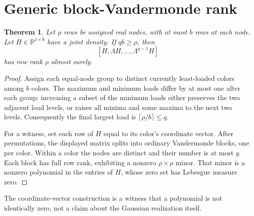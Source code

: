 \documentclass[11pt]{article}
\newtheorem{theorem}{Theorem}[section]
\newcommand{\R}{\mathbb R}
\begin{document}
\section{Generic block-Vandermonde rank}
\begin{theorem}\label{ranklemma}
Let $\rho$ rows be assigned real nodes, with at most $b$ rows at each node.
Let $H\in\R^{\rho\times b}$ have a joint density. If $qb\ge\rho$, then
\[
 [H,\Lambda H,\ldots,\Lambda^{q-1}H]
\]
has row rank $\rho$ almost surely.
\end{theorem}
\begin{proof}
Assign each equal-node group to distinct currently least-loaded colors among
$b$ colors. The maximum and minimum loads differ by at most one after each
group: increasing a subset of the minimum loads either preserves the two
adjacent load levels, or raises all minima and some maxima to the next two
levels. Consequently the final largest load is $\lceil\rho/b\rceil\le q$.

For a witness, set each row of $H$ equal to its color's coordinate vector.
After permutations, the displayed matrix splits into ordinary Vandermonde
blocks, one per color. Within a color the nodes are distinct and their number
is at most $q$. Each block has full row rank, exhibiting a nonzero
$\rho\times\rho$ minor. That minor is a nonzero polynomial in the entries
of $H$, whose zero set has Lebesgue measure zero.
\end{proof}
The coordinate-vector construction is a witness that a polynomial is not
identically zero, not a claim about the Gaussian realization itself.
\end{document}
